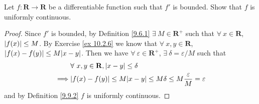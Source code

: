 \begin{exercise}\label{ex 10.2.7}
    Let \(f : \mathbf{R} \to \mathbf{R}\) be a differentiable function such that \(f'\) is bounded.
    Show that \(f\) is uniformly continuous.
\end{exercise}

\begin{proof}
    Since \(f'\) is bounded, by Definition \ref{9.6.1} \(\exists\ M \in \mathbf{R}^+\) such that \(\forall\ x \in \mathbf{R}\), \(\abs*{f(x)} \leq M\).
    By Exercise \ref{ex 10.2.6} we know that \(\forall\ x, y \in \mathbf{R}\), \(\abs*{f(x) - f(y)} \leq M \abs*{x - y}\).
    Then we have \(\forall\ \varepsilon \in \mathbf{R}^+\), \(\exists\ \delta = \varepsilon / M\) such that
    \begin{align*}
                 & \forall\ x, y \in \mathbf{R}, \abs*{x - y} \leq \delta                                          \\
        \implies & \abs*{f(x) - f(y)} \leq M \abs*{x - y} \leq M \delta \leq M \frac{\varepsilon}{M} = \varepsilon
    \end{align*}
    and by Definition \ref{9.9.2} \(f\) is uniformly continuous.
\end{proof}